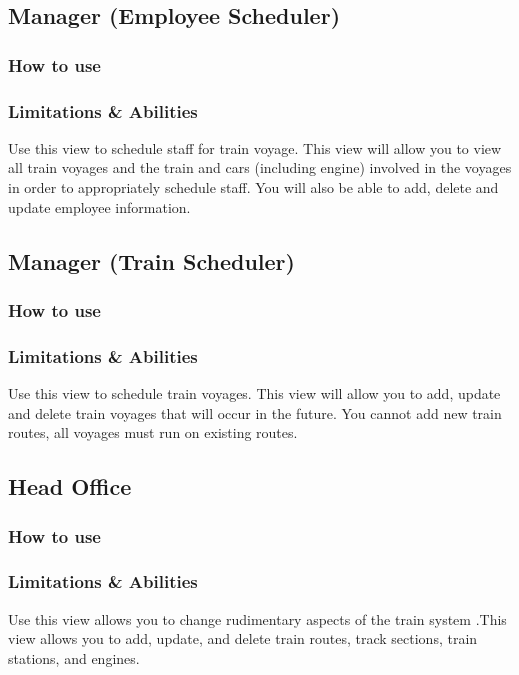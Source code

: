 \documentclass[letter]{article}
\begin{document}
\subsection{Manager (Employee Scheduler)}
\subsubsection{How to use}

\subsubsection{Limitations \& Abilities}
Use this view to schedule staff for train voyage. This view will allow you to view all train voyages and the train and cars (including engine) involved in the voyages in order to appropriately schedule staff. You will also be able to add, delete and update employee information.


\subsection{Manager (Train Scheduler)}
\subsubsection{How to use}

\subsubsection{Limitations \& Abilities}
Use this view to schedule train voyages. This view will allow you to add, update and delete train voyages that will occur in the future. You cannot add new train routes, all voyages must run on existing routes. 


\subsection{Head Office}
\subsubsection{How to use}

\subsubsection{Limitations \& Abilities}
Use this view allows you to change rudimentary aspects of the train system .This view allows you to add, update, and delete train routes, track sections, train stations, and engines.
\end{document}
